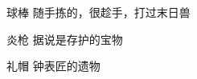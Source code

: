 

\begin{cvskills}

  \cvskill
    {球棒} %
    {随手拣的，很趁手，打过末日兽} %

  \cvskill
    {炎枪} %
    {据说是存护的宝物} %

  \cvskill
    {礼帽} %
    {钟表匠的遗物} %

\end{cvskills}
